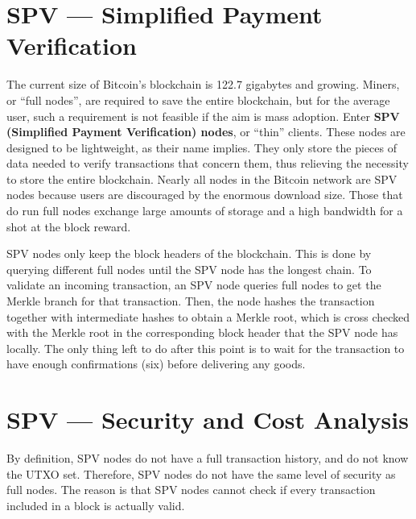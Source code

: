 \documentclass[full.tex]{subfiles}
\begin{document}
 \section*{SPV --- Simplified Payment Verification}
 
 The current size of Bitcoin's blockchain is 122.7 gigabytes and growing. Miners, or ``full nodes'', are required to save the entire blockchain, but for the average user, such a requirement is not feasible if the aim is mass adoption. Enter \textbf{SPV (Simplified Payment Verification) nodes}, or ``thin'' clients. These nodes are designed to be lightweight, as their name implies. They only store the pieces of data needed to verify transactions that concern them, thus relieving the necessity to store the entire blockchain. Nearly all nodes in the Bitcoin network are SPV nodes because users are discouraged by the enormous download size. Those that do run full nodes exchange large amounts of storage and a high bandwidth for a shot at the block reward.
 
 SPV nodes only keep the block headers of the blockchain. This is done by querying different full nodes until the SPV node has the longest chain. To validate an incoming transaction, an SPV node queries full nodes to get the Merkle branch for that transaction. Then, the node hashes the transaction together with intermediate hashes to obtain a Merkle root, which is cross checked with the Merkle root in the corresponding block header that the SPV node has locally. The only thing left to do after this point is to wait for the transaction to have enough confirmations (six) before delivering any goods.
 
 \section*{SPV --- Security and Cost Analysis}
 
 By definition, SPV nodes do not have a full transaction history, and do not know the UTXO set. Therefore, SPV nodes do not have the same level of security as full nodes. The reason is that SPV nodes cannot check if every transaction included in a block is actually valid.
 
\end{document}
